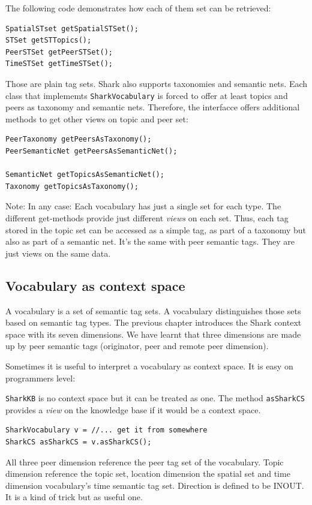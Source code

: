 The following code demonstrates how each of them set can be retrieved:

\begin{verbatim}
SpatialSTset getSpatialSTSet();
STSet getSTTopics();
PeerSTSet getPeerSTSet();
TimeSTSet getTimeSTSet();
\end{verbatim}

Those are plain tag sets. Shark also supports taxonomies and semantic nets. Each class that implememts {\tt SharkVocabulary} is forced to offer at least topics and peers as taxonomy and semantic nets. Therefore, the interfacce offers additional methods to get other views on topic and peer set:

\begin{verbatim}
PeerTaxonomy getPeersAsTaxonomy();
PeerSemanticNet getPeersAsSemanticNet();

SemanticNet getTopicsAsSemanticNet();
Taxonomy getTopicsAsTaxonomy();
\end{verbatim}

Note: In any case: Each vocabulary has just a single set for each type. The different get-methods provide just different {\it views} on each set. Thus, each tag stored in the topic set can be accessed as a simple tag, as part of a taxonomy but also as part of a semantic net. It's the same with peer semantic tags. They are just views on the same data.

\subsection{Vocabulary as context space}
A vocabulary is a set of semantic tag sets. A vocabulary distinguishes those sets based on semantic tag types. The previous chapter introduces the Shark context space with its seven dimensions. We have learnt that three dimensions are made up by peer semantic tags (originator, peer and remote peer dimension).

Sometimes it is useful to interpret a vocabulary as context space. It is easy on programmers level:

{\tt SharkKB} is no context space but it can be treated as one. The method {\tt asSharkCS} provides a {\it view} on the knowledge base if it would be a context space.

\begin{verbatim}
SharkVocabulary v = //... get it from somewhere
SharkCS asSharkCS = v.asSharkCS();
\end{verbatim}

All three peer dimension reference the peer tag set of the vocabulary. Topic dimension reference the topic set, location dimension the spatial set and time dimension vocabulary's time semantic tag set. Direction is defined to be INOUT.
It is a kind of trick but as useful one.

